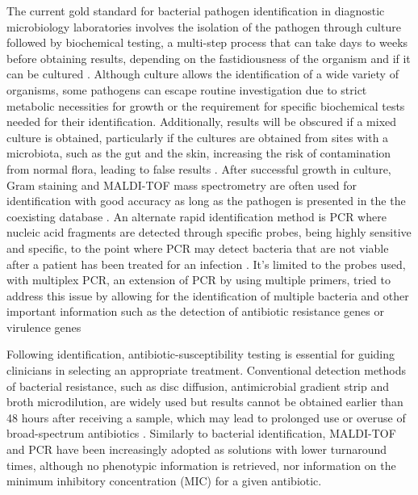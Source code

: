 The current gold standard for bacterial pathogen identification in diagnostic microbiology laboratories involves the isolation of the pathogen through culture followed by biochemical testing, a multi-step process that can take days to weeks before obtaining results, depending on the fastidiousness of the organism and if it can be cultured \citep{muhamad_rizal_advantages_2020, giuliano_guide_2019, muhamad_rizal_advantages_2020}. Although culture allows the identification of a wide variety of organisms, some pathogens can escape routine investigation due to strict metabolic necessities for growth or the requirement for specific biochemical tests needed for their identification. Additionally, results will be obscured if a mixed culture is obtained, particularly if the cultures are obtained from sites with a microbiota, such as the gut and the skin, increasing the risk of contamination from normal flora, leading to false results \citep{giuliano_guide_2019}. After successful growth in culture, Gram staining and MALDI-TOF mass spectrometry are often used for identification with good accuracy as long as the pathogen is presented in the the coexisting database \citep{patel_maldi-tof_2015}. An alternate rapid identification method is PCR where nucleic acid fragments are detected through specific probes, being highly sensitive and specific, to the point where PCR may detect bacteria that are not viable after a patient has been treated for an infection \citep{scerbo_beyond_2016}. It's limited to the probes used, with multiplex PCR, an extension of PCR by using multiple primers, tried to address this issue by allowing for the identification of multiple bacteria and other important information such as the detection of antibiotic resistance genes or virulence genes \citep{giuliano_guide_2019}

Following identification, antibiotic-susceptibility testing is essential for guiding clinicians in selecting an appropriate treatment. Conventional detection methods of bacterial resistance, such as disc diffusion, antimicrobial gradient strip and broth microdilution, are widely used but results cannot be obtained earlier than 48 hours after receiving a sample, which may lead to prolonged use or overuse of broad-spectrum antibiotics \citep{benkova_antimicrobial_2020}. Similarly to bacterial identification, MALDI-TOF and PCR have been increasingly adopted as solutions with lower turnaround times, although no phenotypic information is retrieved, nor information on the minimum inhibitory concentration (MIC) for a given antibiotic.   

